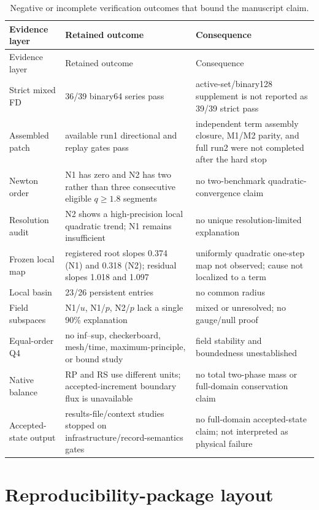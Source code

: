 \documentclass[preprint,12pt,authoryear]{elsarticle}
\begin{document}
\begin{longtable}{@{}p{}p{}p{}@{}}
\caption{Negative or incomplete verification outcomes that bound the manuscript claim.}\label{stab:negative}\\
\toprule
Evidence layer & Retained outcome & Consequence\\
\midrule
\endfirsthead
\toprule
Evidence layer & Retained outcome & Consequence\\
\midrule
\endhead
Strict mixed FD & 36/39 binary64 series pass & active-set/binary128 supplement is not reported as 39/39 strict pass\\
Assembled patch & available run1 directional and replay gates pass & independent term assembly closure, M1/M2 parity, and full run2 were not completed after the hard stop\\
Newton order & N1 has zero and N2 has two rather than three consecutive eligible $q\ge1.8$ segments & no two-benchmark quadratic-convergence claim\\
Resolution audit & N2 shows a high-precision local quadratic trend; N1 remains insufficient & no unique resolution-limited explanation\\
Frozen local map & registered root slopes 0.374 (N1) and 0.318 (N2); residual slopes 1.018 and 1.097 & uniformly quadratic one-step map not observed; cause not localized to a term\\
Local basin & 23/26 persistent entries & no common radius\\
Field subspaces & N1/$u$, N1/$p$, N2/$p$ lack a single 90\% explanation & mixed or unresolved; no gauge/null proof\\
Equal-order Q4 & no inf--sup, checkerboard, mesh/time, maximum-principle, or bound study & field stability and boundedness unestablished\\
Native balance & RP and RS use different units; accepted-increment boundary flux is unavailable & no total two-phase mass or full-domain conservation claim\\
Accepted-state output & results-file/context studies stopped on infrastructure/record-semantics gates & no full-domain accepted-state claim; not interpreted as physical failure\\
\bottomrule
\end{longtable}

\section{Reproducibility-package layout}
\end{document}
